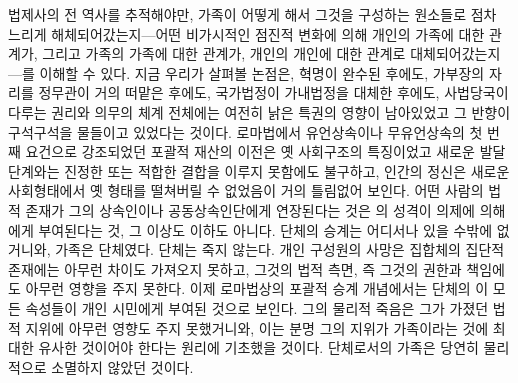 법제사의 전 역사를 추적해야만,
가족이 어떻게 해서 그것을 구성하는 원소들로 점차 느리게
해체되어갔는지---어떤 비가시적인 점진적 변화에 의해
개인의 가족에 대한 관계가,
그리고 가족의 가족에 대한 관계가,
개인의 개인에 대한 관계로 대체되어갔는지---를
이해할 수 있다.
지금 우리가 살펴볼 논점은,
혁명이 완수된 후에도,
가부장의 자리를 정무관이 거의 떠맡은 후에도,
국가법정이 가내법정을 대체한 후에도,
사법당국이 다루는 권리와 의무의 체계 전체에는 여전히
낡은 특권의 영향이 남아있었고 그 반향이 구석구석을 물들이고 있었다는 것이다.
로마법에서 유언상속이나 무유언상속의 첫 번째 요건으로 강조되었던
포괄적 재산의 이전은 옛 사회구조의 특징이었고
새로운 발달단계와는 진정한 또는 적합한 결합을 이루지 못함에도 불구하고,
인간의 정신은 새로운 사회형태에서 옛 형태를 떨쳐버릴 수 없었음이
거의 틀림없어 보인다.
어떤 사람의 법적 존재가 그의 상속인이나 공동상속인단에게
연장된다는 것은
의 성격이 의제에 의해 에게 부여된다는 것,
그 이상도 이하도 아니다.
단체의 승계는 어디서나 있을 수밖에 없거니와, 가족은 단체였다.
단체는 죽지 않는다.
개인 구성원의 사망은 집합체의 집단적 존재에는 아무런 차이도 가져오지 못하고,
그것의 법적 측면, 즉 그것의 권한과 책임에도 아무런 영향을 주지 못한다.
이제 로마법상의 포괄적 승계 개념에서는
단체의 이 모든 속성들이 개인 시민에게
부여된 것으로 보인다.
그의 물리적 죽음은 그가 가졌던 법적 지위에 아무런 영향도 주지 못했거니와,
이는 분명 그의 지위가
가족이라는 것에 최대한 유사한 것이어야 한다는
원리에 기초했을 것이다.
단체로서의 가족은 당연히 물리적으로 소멸하지 않았던 것이다.

